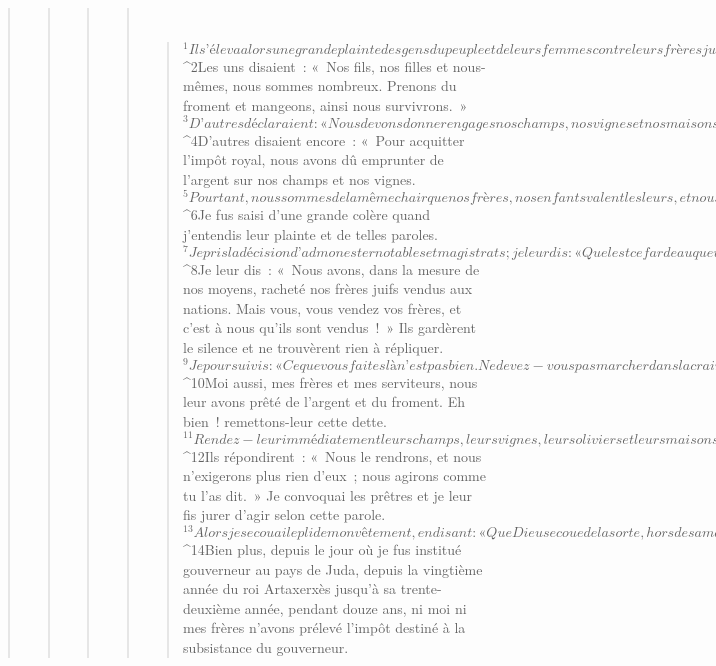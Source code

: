 \begin{verse}
\begin{verse}
\begin{verse}
\begin{verse}
         
      \bchapter{}
      \begin{verse}
${}^{1}Il s’éleva alors une grande plainte des gens du peuple et de leurs femmes contre leurs frères juifs. 
${}^{2}Les uns disaient : « Nos fils, nos filles et nous-mêmes, nous sommes nombreux. Prenons du froment et mangeons, ainsi nous survivrons. » 
${}^{3}D’autres déclaraient : « Nous devons donner en gages nos champs, nos vignes et nos maisons pour avoir du froment pendant la famine. » 
${}^{4}D’autres disaient encore : « Pour acquitter l’impôt royal, nous avons dû emprunter de l’argent sur nos champs et nos vignes. 
${}^{5}Pourtant, nous sommes de la même chair que nos frères, nos enfants valent les leurs, et nous devons livrer en esclavage nos fils et nos filles ; il en est, parmi nos filles, qui déjà sont asservies ! Nous n’y pouvons rien, puisque nos champs et nos vignes sont à d’autres. »
${}^{6}Je fus saisi d’une grande colère quand j’entendis leur plainte et de telles paroles. 
${}^{7}Je pris la décision d’admonester notables et magistrats ; je leur dis : « Quel est ce fardeau que vous faites peser sur vos frères ? » Et je convoquai contre eux une grande assemblée. 
${}^{8}Je leur dis : « Nous avons, dans la mesure de nos moyens, racheté nos frères juifs vendus aux nations. Mais vous, vous vendez vos frères, et c’est à nous qu’ils sont vendus ! » Ils gardèrent le silence et ne trouvèrent rien à répliquer. 
${}^{9}Je poursuivis : « Ce que vous faites là n’est pas bien. Ne devez-vous pas marcher dans la crainte de notre Dieu, pour éviter l’insulte des nations, nos ennemis ? 
${}^{10}Moi aussi, mes frères et mes serviteurs, nous leur avons prêté de l’argent et du froment. Eh bien ! remettons-leur cette dette. 
${}^{11}Rendez-leur immédiatement leurs champs, leurs vignes, leurs oliviers et leurs maisons, et remettez-leur ce qu’ils vous doivent en argent, froment, vin nouveau et huile fraîche que vous leur avez prêtés. » 
${}^{12}Ils répondirent : « Nous le rendrons, et nous n’exigerons plus rien d’eux ; nous agirons comme tu l’as dit. » Je convoquai les prêtres et je leur fis jurer d’agir selon cette parole. 
${}^{13}Alors je secouai le pli de mon vêtement, en disant : « Que Dieu secoue de la sorte, hors de sa maison et de ses biens, quiconque ne tiendra pas cette parole : qu’il soit ainsi secoué et dépouillé ! » Toute l’assemblée répondit : « Amen ! » et loua le Seigneur. Et le peuple agit selon ce qui avait été dit.
${}^{14}Bien plus, depuis le jour où je fus institué gouverneur au pays de Juda, depuis la vingtième année du roi Artaxerxès jusqu’à sa trente-deuxième année, pendant douze ans, ni moi ni mes frères n’avons prélevé l’impôt destiné à la subsistance du gouverneur. 

\end{verse}
\end{verse}
\end{verse}
\end{verse}
\end{verse}
